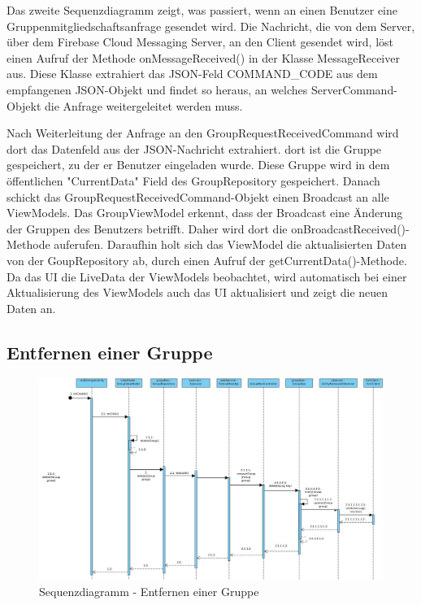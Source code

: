 Das zweite Sequenzdiagramm zeigt, was passiert, wenn an einen Benutzer eine Gruppenmitgliedschaftsanfrage gesendet wird. Die Nachricht, die von dem Server, über dem Firebase Cloud Messaging Server, an den Client gesendet wird, löst einen Aufruf der Methode onMessageReceived() in der Klasse MessageReceiver aus. Diese Klasse extrahiert das JSON-Feld COMMAND\_CODE aus dem empfangenen JSON-Objekt und findet so heraus, an welches ServerCommand-Objekt die Anfrage weitergeleitet werden muss.

Nach Weiterleitung der Anfrage an den GroupRequestReceivedCommand wird dort das Datenfeld aus der JSON-Nachricht extrahiert. dort ist die Gruppe gespeichert, zu der er Benutzer eingeladen wurde. Diese Gruppe wird in dem öffentlichen "CurrentData" Field des GroupRepository gespeichert. Danach schickt das GroupRequestReceivedCommand-Objekt einen Broadcast an alle ViewModels. Das GroupViewModel erkennt, dass der Broadcast eine Änderung der Gruppen des Benutzers betrifft. Daher wird dort die onBroadcastReceived()-Methode auferufen. Daraufhin holt sich das ViewModel die aktualisierten Daten von der GoupRepository ab, durch einen Aufruf der getCurrentData()-Methode. Da das UI die LiveData der ViewModels beobachtet, wird automatisch bei einer Aktualisierung des ViewModels auch das UI aktualisiert und zeigt die neuen Daten an.

\subsection{Entfernen einer Gruppe}

\begin{figure}[H]
	\centering
	\includegraphics[width=1\textwidth]{../Sequenzdiagramme/deleteGroup_sequenz.jpg}
	\caption{Sequenzdiagramm - Entfernen einer Gruppe}
\end{figure}

